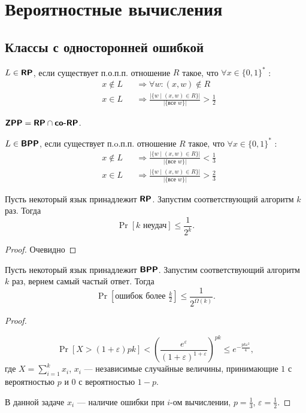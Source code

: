\newpage
{}
\section{Вероятностные вычисления}
\subsection{Классы с односторонней ошибкой}
\begin{defn}[Класс $ \RP$]\index{\RP}
	$ L \in \textmd{\textbf{\textsf{RP}}}$, если существует п.о.п.п. отношение $ R$ такое, что $ \forall x \in \{0, 1\}^{*}$ :
	\[
		\begin{aligned}
		&x \notin L && \Longrightarrow \forall w \colon (x, w) \notin R \\
		&x \in L && \Longrightarrow \frac{ \lvert \{w \mid (x, w) \in  R\} \rvert }{\lvert \{\text{все } w\} \rvert } > \frac{1}{2}
		\end{aligned}
	\]
\end{defn}
\begin{defn}\index{\ZPP}
	$ \textmd{\textbf{\textsf{ZPP}}} = \textmd{\textbf{\textsf{RP}}} \cap \textmd{\textbf{\textsf{co-RP}}}$.
\end{defn}

\begin{defn}\index{\BPP}
	$ L \in \textmd{\textbf{\textsf{BPP}}}$, если существует п.o.п.п. отношение $ R$ такое, что $ \forall x \in \{0, 1\}^{*}$ :
	\[
		\begin{aligned}
		&x \notin L && \Longrightarrow \frac{ \lvert \{w \mid (x, w) \in  R\} \rvert }{\lvert \{\text{все } w\} \rvert } < \frac{1}{3}\\
		&x \in L && \Longrightarrow \frac{ \lvert \{w \mid (x, w) \in  R\} \rvert }{\lvert \{\text{все } w\} \rvert } > \frac{2}{3}
		\end{aligned}
	\]
\end{defn}

\begin{lm}
	Пусть некоторый язык принадлежит $ \RP$. Запустим соответствующий алгоритм $ k$ раз. Тогда
	\[
		\Pr[k \text{ неудач}] \le \frac{1}{2^{k}}
	.\]
\end{lm}
\begin{proof}
	Очевидно
\end{proof}
\begin{lm}
	Пусть некоторый язык принадлежит $ \textmd{\textbf{\textsf{BPP}}}$. Запустим соответствующий алгоритм $ k$ раз, вернем самый частый ответ. Тогда
	\[
		\Pr[\text{ошибок более } \tfrac{k}{2}] \le \frac{1}{2^{\Omega (k)}}
	.\]
\end{lm}
\begin{proof}
	\begin{st}
		\[
			\Pr[X > (1+\varepsilon ) p k] < \left( \frac{e^{\varepsilon }}{(1+\varepsilon)^{1+\varepsilon } } \right) ^{p k} \le e^{-\frac{pk \varepsilon ^2}{4}}
		,\]
		где $ X = \sum_{i=1}^{k} x_i$, $ x_{i}$ --- независимые случайные величины, принимающие $ 1$ с вероятностью $ p$ и $ 0$ с вероятностью $ 1-p$.
	\end{st}
	В данной задаче $ x_i$ --- наличие ошибки при $ i$-ом вычислении, $ p = \frac{1}{3}$, $ \varepsilon  = \frac{1}{2}$.
\end{proof}

